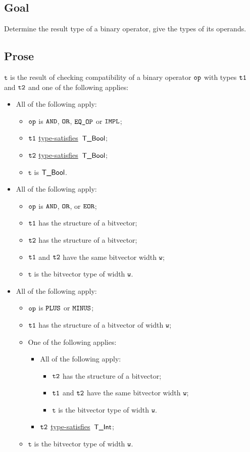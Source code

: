 \documentclass{book}
\newcommand\typesatisfies[0]{\hyperlink{def-typesatisfies}{type-satisfies}}
\newcommand\vt[0]{\texttt{t}}
\newcommand\vw[0]{\texttt{w}}
\begin{document}
\subsection{Goal}
Determine the result type of a binary operator, give the types of its operands.

\subsection{Prose}
  $\vt$ is the result of checking compatibility of a binary operator $\texttt{op}$ with
  types $\texttt{t1}$ and $\texttt{t2}$ and one of the following applies:
\begin{itemize}
  \item All of the following apply:
  \begin{itemize}
    \item $\texttt{op}$ is $\texttt{AND}$, $\texttt{OR}$, $\texttt{EQ\_OP}$ or $\texttt{IMPL}$;
    \item $\texttt{t1}$ \typesatisfies\  $\textsf{T\_Bool}$;
    \item $\texttt{t2}$ \typesatisfies\  $\textsf{T\_Bool}$;
    \item $\vt$ is $\textsf{T\_Bool}$.
  \end{itemize}

  \item All of the following apply:
  \begin{itemize}
    \item $\texttt{op}$ is $\texttt{AND}$, $\texttt{OR}$, or $\texttt{EOR}$;
    \item $\texttt{t1}$ has the structure of a bitvector;
    \item $\texttt{t2}$ has the structure of a bitvector;
    \item $\texttt{t1}$ and $\texttt{t2}$ have the same bitvector width $\vw$;
    \item $\vt$ is the bitvector type of width $\vw$.
  \end{itemize}

  \item All of the following apply:
  \begin{itemize}
    \item $\texttt{op}$ is $\texttt{PLUS}$ or $\texttt{MINUS}$;
    \item $\texttt{t1}$ has the structure of a bitvector of width $\vw$;
    \item One of the following applies:
    \begin{itemize}
      \item All of the following apply:
      \begin{itemize}
        \item $\texttt{t2}$ has the structure of a bitvector;
        \item $\texttt{t1}$ and $\texttt{t2}$ have the same bitvector width $\vw$;
        \item $\vt$ is the bitvector type of width $\vw$.
      \end{itemize}
      \item $\texttt{t2}$ \typesatisfies\  $\textsf{T\_Int}$;
    \end{itemize}
    \item $\vt$ is the bitvector type of width $\vw$.
  \end{itemize}


\end{itemize}
\end{document}

